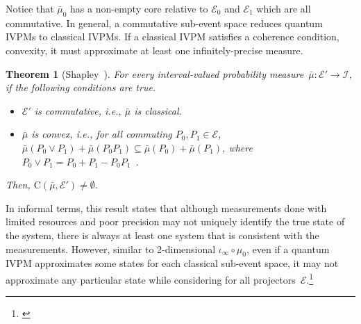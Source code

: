 \documentclass[english,reprint, aps, prl,superscriptaddress, showpacs,
showkeys, longbibliography, amsmath, amssymb]{revtex4-1}
\theoremstyle{plain}
\newtheorem{thm}{Theorem}
\theoremstyle{definition}
\newcommand{\events}{\ensuremath{\mathcal{E}}}
\newcommand{\yutsung}[1]{\begin{framed}\begin{minipage}{0.9\linewidth}\color{purple}{Yu-Tsung says: #1}\end{minipage}\end{framed}}
\newcommand{\coreBorn}{\ensuremath{\mathrm{C}}}
\begin{document}
Notice that $\bar{\mu}_{0}$ has a non-empty core relative to $\events_{0}$
and $\events_{1}$ which are all commutative. In general, a commutative
sub-event space reduces quantum IVPMs to classical IVPMs. If a classical
IVPM satisfies a coherence condition, convexity, it must approximate
at least one infinitely-precise measure.

\begin{thm}[Shapley~\cite{Shapley1971,Grabisch2016}]\label{thm:Shapley}For
every interval-valued probability measure~$\bar{\mu}:\events'\rightarrow\mathscr{I}$,
if the following conditions are true.
\begin{itemize}
\item $\events'$ is commutative, i.e., $\bar{\mu}$ is classical.
\item $\bar{\mu}$ is convex, i.e., for all commuting $P_{0},P_{1}\in\events$,
$\bar{\mu}\left(P_{0}\vee P_{1}\right)+\bar{\mu}\left(P_{0}P_{1}\right)\subseteq\bar{\mu}\left(P_{0}\right)+\bar{\mu}\left(P_{1}\right)$,
where $P_{0}\vee P_{1}=P_{0}+P_{1}-P_{0}P_{1}$~\cite{Griffiths2003}.
\end{itemize}
Then, $\coreBorn\left(\bar{\mu},\events'\right)\ne\emptyset$.\end{thm}

In informal terms, this result states that although measurements done
with limited resources and poor precision may not uniquely identify
the true state of the system, there is always at least one system
that is consistent with the measurements. However, similar to 2-dimensional
$\iota_{\infty}\circ\mu_{0}$, even if a quantum IVPM approximates
some states for each classical sub-event space, it may not approximate
any particular state while considering for all projectors~$\events$.\footnote{\yutsung{It seems that our example in 4 dimensions together with
relativity core would be unnecessary complex. Therefore, I roll our
example back to 3 dimensions.}}
\end{document}

